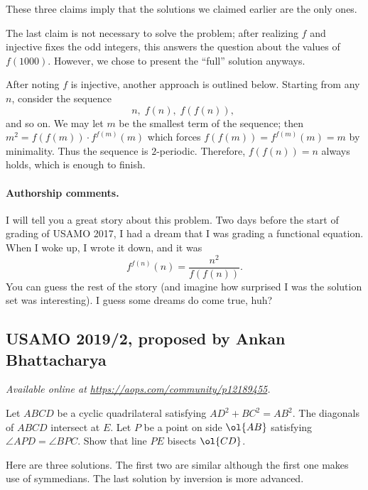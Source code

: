 \documentclass[11pt]{scrartcl}
\begin{document}
These three claims imply that the solutions we claimed earlier
are the only ones.

\begin{remark*}
  The last claim is not necessary to solve the problem;
  after realizing $f$ and injective fixes the odd integers,
  this answers the question about the values of $f(1000)$.
  However, we chose to present the ``full'' solution anyways.
\end{remark*}

\begin{remark*}
  After noting $f$ is injective, another approach is outlined below.
  Starting from any $n$, consider the sequence
  \[ n, \; f(n), \; f(f(n)), \; \]
  and so on.
  We may let $m$ be the smallest term of the sequence;
  then $m^2 = f(f(m)) \cdot f^{f(m)}(m)$
  which forces $f(f(m)) = f^{f(m)}(m) = m$ by minimality.
  Thus the sequence is $2$-periodic.
  Therefore, $f(f(n)) = n$ always holds,
  which is enough to finish.
\end{remark*}

\paragraph{Authorship comments.}
I will tell you a great story about this problem.
Two days before the start of grading of USAMO 2017,
I had a dream that I was grading a functional equation.
When I woke up, I wrote it down, and it was
\[ f^{f(n)}(n) = \frac{n^2}{f(f(n))}. \]
You can guess the rest of the story
(and imagine how surprised I was the solution set was interesting).
I guess some dreams do come true, huh?
\pagebreak

\subsection{USAMO 2019/2, proposed by Ankan Bhattacharya}
\textsl{Available online at \url{https://aops.com/community/p12189455}.}
\begin{mdframed}[style=mdpurplebox,frametitle={Problem statement}]
Let $ABCD$ be a cyclic quadrilateral
satisfying $AD^2 + BC^2 = AB^2$.
The diagonals of $ABCD$ intersect at $E$.
Let $P$ be a point on side $\ol{AB}$
satisfying $\angle APD = \angle BPC$.
Show that line $PE$ bisects $\ol{CD}$.
\end{mdframed}
Here are three solutions.
The first two are similar although the first one makes use of symmedians.
The last solution by inversion is more advanced.
\end{document}
